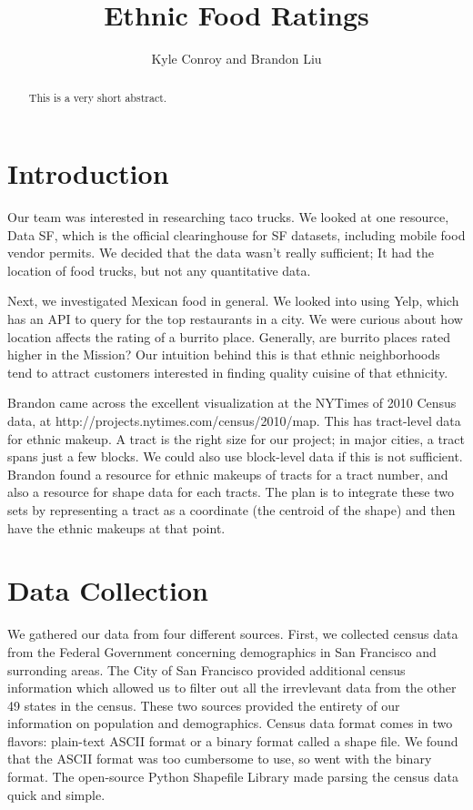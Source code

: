 \documentclass[11pt,twocolumn]{article}
\author{Kyle Conroy and Brandon Liu}
\title{Ethnic Food Ratings}
\begin{document}
\maketitle

\begin{abstract}
This is a very short abstract.
\end{abstract}

\section{Introduction}

Our team was interested in researching taco trucks. We looked at one resource, Data SF, which is the official clearinghouse for SF datasets, including mobile food vendor permits. We decided that the data wasn’t really sufficient; It had the location of food trucks, but not any quantitative data.

Next, we investigated Mexican food in general. We looked into using Yelp, which has an API to query for the top restaurants in a city. We were curious about how location affects the rating of a burrito place. Generally, are burrito places rated higher in the Mission? Our intuition behind this is that ethnic neighborhoods tend to attract customers interested in finding quality cuisine of that ethnicity.

Brandon came across the excellent visualization at the NYTimes of 2010 Census data, at http://projects.nytimes.com/census/2010/map. This has tract-level data for ethnic makeup. A tract is the right size for our project; in major cities, a tract spans just a few blocks. We could also use block-level data if this is not sufficient. Brandon found a resource for ethnic makeups of tracts for a tract number, and also a resource for shape data for each tracts. The plan is to integrate these two sets by representing a tract as a coordinate (the centroid of the shape) and then have the ethnic makeups at that point.

\section{Data Collection}

We gathered our data from four different sources. First, we collected census data from the Federal Government concerning demographics in San Francisco and surronding areas. The City of San Francisco provided additional census information which allowed us to filter out all the irrevlevant data from the other 49 states in the census. These two sources provided the entirety of our information on population and demographics. Census data format comes in two flavors: plain-text ASCII format or a binary format called a shape file. We found that the ASCII format was too cumbersome to use, so went with the binary format. The open-source Python Shapefile Library made parsing the census data quick and simple.
\end{document}

